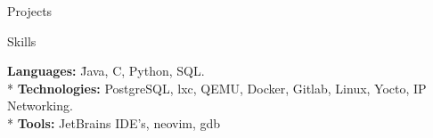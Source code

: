 \documentclass{article}
\newlength{\tabin}
\newlength{\secsep}
\newcommand{\lineunder}{\vspace*{-8pt} \\ \hspace*{-6pt} \hrulefill \\ \vspace*{-15pt}}
\newenvironment{tabbedsection}[1]{
	\begin{list}{}{
			\setlength{\itemsep}{0pt}
			\setlength{\labelsep}{0pt}
			\setlength{\labelwidth}{0pt}
			\setlength{\leftmargin}{0pt}
			\setlength{\rightmargin}{\tabin}
			\setlength{\listparindent}{0pt}
			\setlength{\parsep}{0pt}
			\setlength{\parskip}{0pt}
			\setlength{\partopsep}{0pt}
			\setlength{\topsep}{#1}
		}
		\item[]
	}{\end{list}}
\newenvironment{nospacetabbing}{
	\begin{tabbing}
	}{\end{tabbing}\vspace{-1.2em}}
\newenvironment{resume_section}[1]{
	\filbreak
	\vspace{2\secsep}
	\textsc{\color{blue}\large#1}
	\lineunder
	\begin{tabbedsection}{\secsep}
	}{\end{tabbedsection}}
\newenvironment{resume_subsection}[2]{
	\textbf{\color{BlueViolet}#2} \hfill {\normalsize (#1)} \hspace{-5em}
	\begin{tabbedsection}{0.5\secsep}
		\begin{subitems}
		}{\end{subitems}\end{tabbedsection}}
\newenvironment{subitems}{
	\renewcommand{\labelitemi}{-}
	\begin{itemize}
		\setlength{\labelsep}{1em}
	}{\end{itemize}}
\begin{document}
\begin{resume_section}{Projects}
		\iffalse
		\begin{resume_subsection}{August 2017 - May 2019}{University Robotics Competition Team}
			\begin{itemize}
				\item 
					As a member of multiple sub teams, using C++ programmed kinematics for Rover’s waypoint navigation, calculated distance of
					objects to Rover given Computer Vision data.
				\item 
					Lead the communications and user interface team.
			\end{itemize}
		\end{resume_subsection}
		\vspace{2\secsep}
		\begin{resume_subsection}{Fall 2018}{Mobile Robotics Project}
			Programmed in C++ to implemented GPS navigation, path planning, and tennis ball (object) detection for autonomous traversal task.
			Using the random error from GPS measurements, created a random searching method. Interfacing programs and data with Robotic
			Operating System. Created simple reactive obstacle avoidance and a waypoint navigation inspired by bug algorithm.
		\end{resume_subsection}
		\fi
	\end{resume_section}
	
	\begin{resume_section}{Skills}
	\begin{nospacetabbing}
		\textbf{Languages:} \hspace{5em} \=Java, C, Python, SQL.\\*
		\textbf{Technologies:} \> PostgreSQL, lxc, QEMU, Docker, Gitlab, Linux, Yocto, IP Networking.\\*
		\textbf{Tools:} \> JetBrains IDE's, neovim, gdb
	\end{nospacetabbing}
	\end{resume_section}
	
\end{document}
